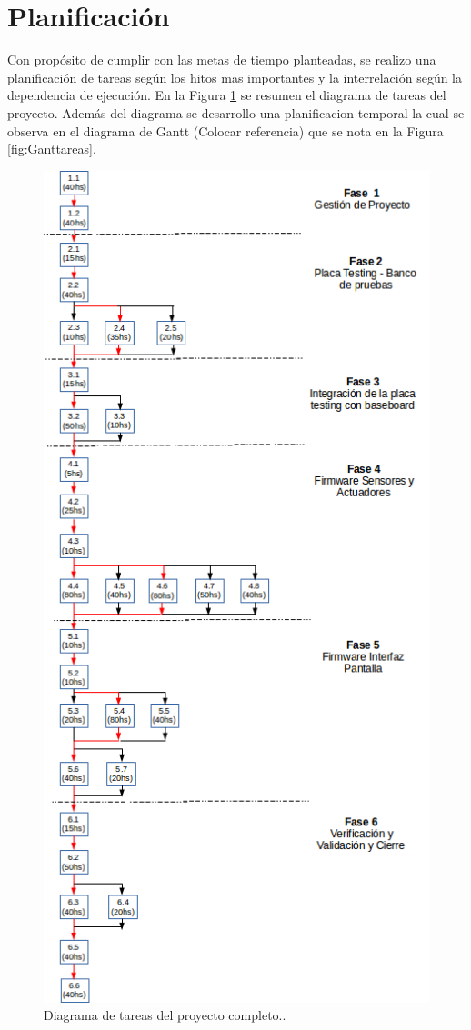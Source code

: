 \section{Planificación} 

Con propósito de cumplir con las metas de tiempo planteadas, se realizo una planificación de tareas según los hitos mas importantes y la interrelación según la dependencia de ejecución. En la Figura \ref{fig:WBStareas} se resumen el diagrama de tareas del proyecto.
Además del diagrama se desarrollo una planificacion temporal la cual se observa en el diagrama de Gantt (Colocar referencia) que se nota en la Figura \ref{fig:Ganttareas}.

\begin{figure}[h!]
	\centering
	\includegraphics[scale=.8]{Figures/WBS_tareas}
	\caption{Diagrama de tareas del proyecto completo.\protect\footnotemark.}
	\label{fig:WBStareas}
\end{figure}

